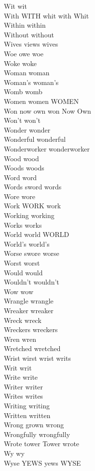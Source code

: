 Wit wit\\
With WITH whit with Whit\\
Within within\\
Without without\\
Wives views wives\\
Woe owe woe\\
Woke woke\\
Woman woman\\
Woman's woman's\\
Womb womb\\
Women women WOMEN\\
Won now own won Now Own\\
Won't won't\\
Wonder wonder\\
Wonderful wonderful\\
Wonderworker wonderworker\\
Wood wood\\
Woods woods\\
Word word\\
Words sword words\\
Wore wore\\
Work WORK work\\
Working working\\
Works works\\
World world WORLD\\
World's world's\\
Worse swore worse\\
Worst worst\\
Would would\\
Wouldn't wouldn't\\
Wow wow\\
Wrangle wrangle\\
Wreaker wreaker\\
Wreck wreck\\
Wreckers wreckers\\
Wren wren\\
Wretched wretched\\
Wrist wirst wrist writs\\
Writ writ\\
Write write\\
Writer writer\\
Writes writes\\
Writing writing\\
Written written\\
Wrong grown wrong\\
Wrongfully wrongfully\\
Wrote tower Tower wrote\\
Wy wy\\
Wyse YEWS yews WYSE\\


